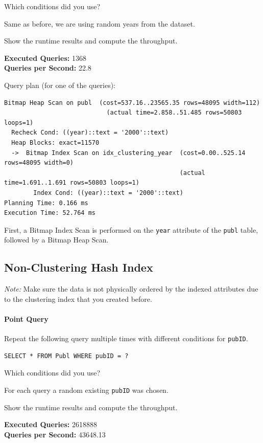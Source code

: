 \documentclass[11pt]{scrartcl}
\begin{document}
Which conditions did you use?

Same as before, we are using random years from the dataset.

Show the runtime results and compute the throughput.

\textbf{Executed Queries: } 1368\\
\textbf{Queries per Second: } 22.8

Query plan (for one of the queries):

{\small
\parskip0pt\begin{verbatim}
Bitmap Heap Scan on publ  (cost=537.16..23565.35 rows=48095 width=112)
                            (actual time=2.858..51.485 rows=50803 loops=1)
  Recheck Cond: ((year)::text = '2000'::text)
  Heap Blocks: exact=11570
  ->  Bitmap Index Scan on idx_clustering_year  (cost=0.00..525.14 rows=48095 width=0)
                                                (actual time=1.691..1.691 rows=50803 loops=1)
        Index Cond: ((year)::text = '2000'::text)
Planning Time: 0.166 ms
Execution Time: 52.764 ms
\end{verbatim}}

First, a Bitmap Index Scan is performed on the \texttt{year} attribute of the \texttt{publ} table, followed by a Bitmap
Heap Scan.

\subsection*{Non-Clustering Hash Index}

\emph{Note:} Make sure the data is not physically ordered by the indexed attributes due to the clustering index that you created before.

\paragraph{Point Query}

Repeat the following query multiple times with different conditions for \texttt{pubID}.

\begin{lstlisting}[style=dbtsql]
SELECT * FROM Publ WHERE pubID = ?
\end{lstlisting}

Which conditions did you use?

For each query a random existing \texttt{pubID} was chosen.

Show the runtime results and compute the throughput.

\textbf{Executed Queries: } 2618888\\
\textbf{Queries per Second: } 43648.13
\end{document}
